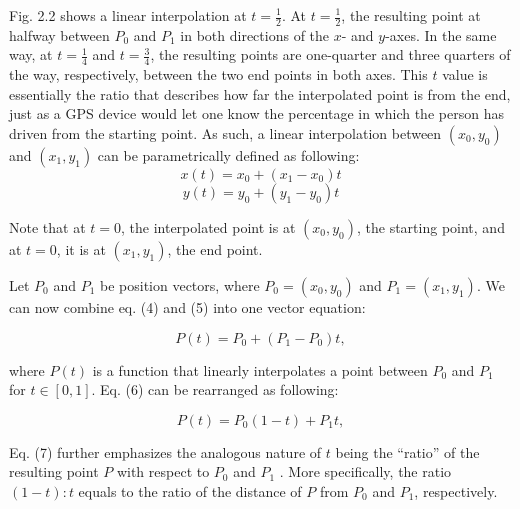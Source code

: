 \documentclass[12pt, oneside]{article}   	%
\numberwithin{figure}{section}
\begin{document}
Fig. 2.2 shows a linear interpolation at \(t=\frac{1}{2}\). At \(t=\frac{1}{2}\), the resulting point at halfway between \(P_0\) and \(P_1\) in both directions of the \(x\)- and \(y\)-axes. In the same way, at \(t=\frac{1}{4}\) and \(t=\frac{3}{4}\), the resulting points are one-quarter and three quarters of the way, respectively, between the two end points in both axes. This \(t\) value is essentially the ratio that describes how far the interpolated point is from the end, just as a GPS device would let one know the percentage in which the person has driven from the starting point. As such, a linear interpolation between \((x_0, y_0)\) and \((x_1,y_1)\) can be parametrically defined as following:
\begin{equation}
x(t)=x_0 + (x_1 - x_0)t
\end{equation}
\begin{equation}
y(t)=y_0 + (y_1 - y_0)t
\end{equation}

Note that at \(t=0\), the interpolated point is at \((x_0, y_0)\), the starting point, and at \(t=0\), it is at \((x_1,y_1)\), the end point.

Let \(P_0\) and \(P_1\) be position vectors, where \(P_0=(x_0,y_0)\) and \(P_1=(x_1,y_1)\). We can now combine eq. (4) and (5) into one vector equation:

\begin{equation}
P(t)=P_0 + (P_1 - P_0)t,
\end{equation}

where \(P(t)\) is a function that linearly interpolates a point between \(P_0\) and \(P_1\) for \(t \in [0,1]\). Eq. (6) can be rearranged as following:

\begin{equation}
P(t)={P_0}(1-t) + {P_1}t,
\end{equation}

Eq. (7) further emphasizes the analogous nature of \(t\) being the ``ratio'' of the resulting point \(P\) with respect to \(P_0\) and \(P_1\) . More specifically, the ratio \((1-t):t\) equals to the ratio of the distance of \(P\) from \(P_0\) and \(P_1\), respectively.

\end{document}
